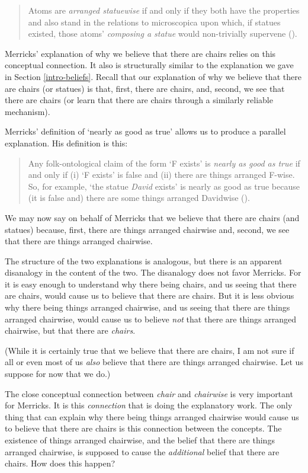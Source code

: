 \documentclass[12pt,twoside]{reedfancy}
\begin{document}
\begin{spacing}{1.25}
\begin{quote}
Atoms are \emph{arranged statuewise} if and only if they both have the
properties and also stand in the relations to microscopica upon which,
if statues existed, those atoms' \emph{composing a statue} would
non-trivially supervene (\citeyear[4]{merricks2001a}).
\end{quote}

Merricks' explanation of why we believe that there are chairs relies
on this conceptual connection.  It also is structurally similar to the
explanation we gave in Section \ref{intro-beliefs}.  Recall that our
explanation of why we believe that there are chairs (or statues) is
that, first, there are chairs, and, second, we see that there are
chairs (or learn that there are chairs through a similarly reliable
mechanism).

Merricks' definition of `nearly as good as true' allows us to produce
a parallel explanation.  His definition is this:

\begin{quote}
Any folk-ontological claim of the form `F exists' is \emph{nearly as
  good as true} if and only if (i) `F exists' is false and (ii) there
are things arranged F-wise. So, for example, `the statue \emph{David}
exists' is nearly as good as true because (it is false and) there are
some things arranged Davidwise (\citeyear[171]{merricks2001a}).
\end{quote}

We may now say on behalf of Merricks that we believe that there are
chairs (and statues) because, first, there are things arranged
chairwise and, second, we see that there are things arranged
chairwise.

The structure of the two explanations is analogous, but there is an
apparent disanalogy in the content of the two.  The disanalogy does
not favor Merricks.  For it is easy enough to understand why there
being chairs, and us seeing that there are chairs, would cause us to
believe that there are chairs.  But it is less obvious why there being
things arranged chairwise, and us seeing that there are things
arranged chairwise, would cause us to believe {\em not} that there are
things arranged chairwise, but that there are {\em chairs}.

(While it is certainly true that we believe that there are chairs, I
am not sure if all or even most of us {\em also} believe that there
are things arranged chairwise.  Let us suppose for now that we do.)

The close conceptual connection between {\em chair} and {\em
  chairwise} is very important for Merricks.  It is this {\em
  connection} that is doing the explanatory work.  The only thing that
can explain why there being things arranged chairwise would cause us
to believe that there are chairs is this connection between the
concepts.  The existence of things arranged chairwise, and the belief
that there are things arranged chairwise, is supposed to cause the
{\em additional} belief that there are chairs.  How does this happen?


\end{spacing}
\end{document}
